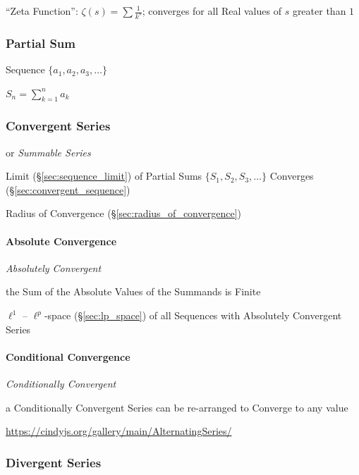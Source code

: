 ``Zeta Function'': $\zeta(s) = \sum \frac{1}{k^s}$; converges for all Real
values of $s$ greater than $1$



\subsubsection{Partial Sum}\label{sec:partial_sum}

Sequence $\{ a_1, a_2, a_3, \ldots \}$

$S_n = \sum_{k=1}^n a_k$



\subsubsection{Convergent Series}\label{sec:convergent_series}

or \emph{Summable Series}

Limit (\S\ref{sec:sequence_limit}) of Partial Sums $\{ S_1, S_2, S_3,
\ldots \}$ Converges (\S\ref{sec:convergent_sequence})

\fist Radius of Convergence (\S\ref{sec:radius_of_convergence})



\paragraph{Absolute Convergence}\label{sec:absolute_convergence}\hfill

\emph{Absolutely Convergent}

the Sum of the Absolute Values of the Summands is Finite

$\ell^1$ -- $\ell^p$-space (\S\ref{sec:lp_space}) of all Sequences with
Absolutely Convergent Series



\paragraph{Conditional Convergence}\label{sec:conditional_convergence}\hfill

\emph{Conditionally Convergent}

a Conditionally Convergent Series can be re-arranged to Converge to any value

\url{https://cindyjs.org/gallery/main/AlternatingSeries/}



\subsubsection{Divergent Series}\label{sec:divergent_series}


